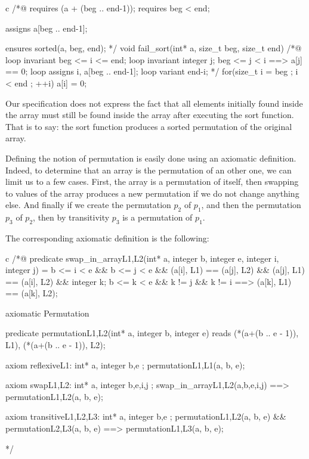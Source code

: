 \begin{CodeBlock}{c}
/*@
  requires \valid(a + (beg .. end-1));
  requires beg < end;

  assigns  a[beg .. end-1];
  
  ensures sorted(a, beg, end);
*/
void fail_sort(int* a, size_t beg, size_t end){
  /*@
    loop invariant beg <= i <= end;
    loop invariant \forall integer j; beg <= j < i ==> a[j] == 0;
    loop assigns i, a[beg .. end-1];
    loop variant end-i;
  */
  for(size_t i = beg ; i < end ; ++i)
    a[i] = 0;
}
\end{CodeBlock}



Our specification does not express the fact that all elements initially
found inside the array must still be found inside the array after
executing the sort function. That is to say: the sort function produces
a sorted permutation of the original array.

Defining the notion of permutation is easily done using an axiomatic
definition. Indeed, to determine that an array is the permutation of an
other one, we can limit us to a few cases. First, the array is a
permutation of itself, then swapping to values of the array produces a
new permutation if we do not change anything else. And finally if we
create the permutation $p_2$ of $p_1$, and then the permutation
$p_3$ of $p_2$, then by transitivity $p_3$ is a permutation of
$p_1$.



The corresponding axiomatic definition is the following:



\begin{CodeBlock}{c}
/*@
  predicate swap_in_array{L1,L2}(int* a, integer b, integer e, integer i, integer j) =
    b <= i < e && b <= j < e &&
    \at(a[i], L1) == \at(a[j], L2) && \at(a[j], L1) == \at(a[i], L2) &&
    \forall integer k; b <= k < e && k != j && k != i ==> \at(a[k], L1) == \at(a[k], L2);

  axiomatic Permutation{
    predicate permutation{L1,L2}(int* a, integer b, integer e)
     reads \at(*(a+(b .. e - 1)), L1), \at(*(a+(b .. e - 1)), L2);

    axiom reflexive{L1}: 
      \forall int* a, integer b,e ; permutation{L1,L1}(a, b, e);

    axiom swap{L1,L2}:
      \forall int* a, integer b,e,i,j ;
        swap_in_array{L1,L2}(a,b,e,i,j) ==> permutation{L1,L2}(a, b, e);
	
    axiom transitive{L1,L2,L3}:
      \forall int* a, integer b,e ; 
        permutation{L1,L2}(a, b, e) && permutation{L2,L3}(a, b, e) ==> permutation{L1,L3}(a, b, e);
  }
*/
\end{CodeBlock}



